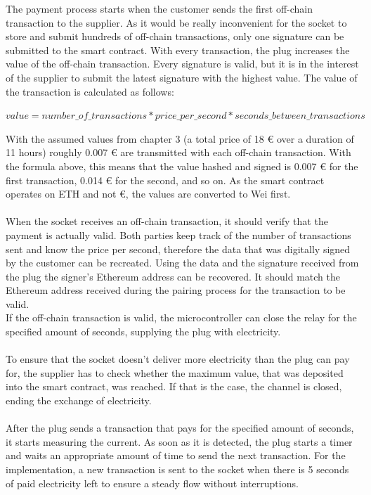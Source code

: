 The payment process starts when the customer sends the first off-chain transaction to the supplier.
As it would be really inconvenient for the socket to store and submit hundreds of off-chain transactions, only one signature can be submitted to the smart contract.
With every transaction, the plug increases the value of the off-chain transaction.
Every signature is valid, but it is in the interest of the supplier to submit the latest signature with the highest value.
The value of the transaction is calculated as follows:
\begin{center}
$value = number\_of\_transactions * price\_per\_second * seconds\_between\_transactions$
\end{center}
With the assumed values from chapter 3 (a total price of 18 \euro{} over a duration of 11 hours) roughly 0.007 \euro{} are transmitted with each off-chain transaction.
With the formula above, this means that the value hashed and signed is 0.007 \euro{} for the first transaction, 0.014 \euro{} for the second, and so on.
As the smart contract operates on ETH and not \euro, the values are converted to Wei first.
\\\\
When the socket receives an off-chain transaction, it should verify that the payment is actually valid.
Both parties keep track of the number of transactions sent and know the price per second, therefore the data that was digitally signed by the customer can be recreated.
Using the data and the signature received from the plug the signer's Ethereum address can be recovered.
It should match the Ethereum address received during the pairing process for the transaction to be valid.
\\
If the off-chain transaction is valid, the microcontroller can close the relay for the specified amount of seconds, supplying the plug with electricity.
\\\\
To ensure that the socket doesn’t deliver more electricity than the plug can pay for, the supplier has to check whether the maximum value, that was deposited into the smart contract, was reached.
If that is the case, the channel is closed, ending the exchange of electricity.
\\\\
After the plug sends a transaction that pays for the specified amount of seconds, it starts measuring the current.
As soon as it is detected, the plug starts a timer and waits an appropriate amount of time to send the next transaction.
For the implementation, a new transaction is sent to the socket when there is 5 seconds of paid electricity left to ensure a steady flow without interruptions.
